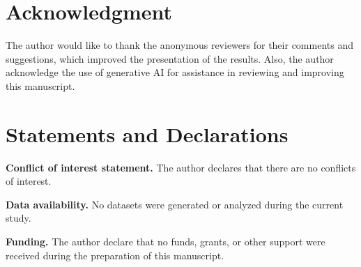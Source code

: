 \documentclass[12pt,titlepage]{amsart}
\theoremstyle{definition}
\theoremstyle{remark}
\begin{document}
\section{\textbf{Acknowledgment}}
The author would like to thank the anonymous reviewers for their
comments and suggestions, which improved the presentation of the
results. Also, the author acknowledge the use of generative AI for
assistance in reviewing and improving this manuscript.
\bigskip
\section{\textbf{Statements and Declarations}}
\textbf{Conflict of interest statement.} The author declares that
there are no conflicts of interest.

\textbf{Data availability.} No datasets were generated or analyzed
during the current study.

\textbf{Funding.} The author declare that no funds, grants, or
other support were received during the preparation of this
manuscript.





\end{document}
